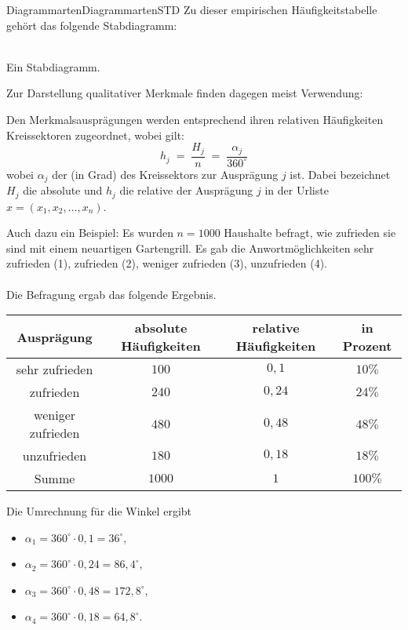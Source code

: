 \begin{MXContent}{Diagrammarten}{Diagrammarten}{STD}
Zu dieser empirischen Häufigkeitstabelle gehört das folgende Stabdiagramm:

\begin{center}
\\
Ein Stabdiagramm.
\end{center}

Zur Darstellung qualitativer Merkmale finden dagegen meist  Verwendung:

\begin{MInfo}
Den Merkmalsausprägungen werden entsprechend ihren relativen Häufigkeiten Kreissektoren zugeordnet, wobei gilt:
$$
h_{j} \; =\; \frac{H_{j}}{n}\;=\;  \frac{\alpha_{j}}{360^{\circ}}
$$
wobei $\alpha_j$ der  (in Grad) des Kreissektors zur Ausprägung $j$ ist.
Dabei bezeichnet $H_{j}$ die absolute und $h_{j}$ die relative  der Ausprägung $j$ in der Urliste $x=(x_{1},x_{2},\ldots ,x_{n})$.
\end{MInfo}

Auch dazu ein Beispiel: Es wurden $n=1000$ Haushalte befragt, wie zufrieden sie sind mit einem neuartigen Gartengrill. Es gab die Anwortmöglichkeiten
sehr zufrieden (1), zufrieden (2), weniger zufrieden (3), unzufrieden (4).
\ \\ \ \\
Die Befragung ergab das folgende Ergebnis.

\begin{center}
\begin{tabular}{|c|c|c|c|}
\hline
Ausprägung & absolute Häufigkeiten & relative Häufigkeiten & in Prozent \\ \hline
sehr zufrieden &  $100$ & $0,1$ & $10\%$ \\ \hline
zufrieden & $240$ & $0,24$ & $24\%$ \\ \hline
weniger zufrieden &$480$ & $0,48$ & $48\%$\\ \hline
unzufrieden & $180$ & $0,18$ & $18\%$ \\ \hline
Summe & $1000$ &  $1$ & $100\%$\\ \hline
\end{tabular}
\end{center}

Die Umrechnung für die Winkel ergibt
\begin{itemize}
\item{$\alpha_{1}=360^{\circ}\cdot 0,1=36^{\circ}$,}
\item{$\alpha_{2}=360^{\circ}\cdot 0,24=86,4^{\circ}$,}
\item{$\alpha_{3}=360^{\circ}\cdot 0,48=172,8^{\circ}$,}
\item{$\alpha_{4}=360^{\circ}\cdot 0,18=64,8^{\circ}$.}
\end{itemize}


\end{MXContent}
